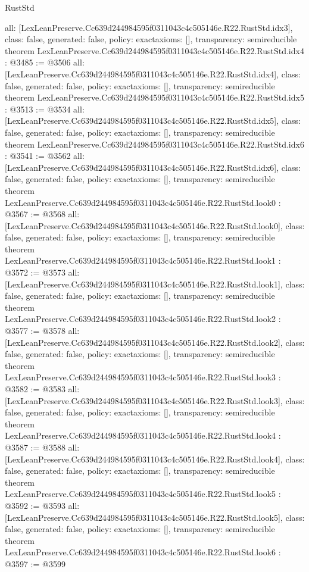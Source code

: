 \begin{lexlean}{RustStd}
\begin{coremodule}
{  all: [LexLeanPreserve.Cc639d244984595f0311043c4c505146e.R22.RustStd.idx3],
  class: false,
  generated: false,
  policy: exact{axioms: []},
  transparency: semireducible
}
theorem LexLeanPreserve.Cc639d244984595f0311043c4c505146e.R22.RustStd.idx4 : @3485 := @3506 {
  all: [LexLeanPreserve.Cc639d244984595f0311043c4c505146e.R22.RustStd.idx4],
  class: false,
  generated: false,
  policy: exact{axioms: []},
  transparency: semireducible
}
theorem LexLeanPreserve.Cc639d244984595f0311043c4c505146e.R22.RustStd.idx5 : @3513 := @3534 {
  all: [LexLeanPreserve.Cc639d244984595f0311043c4c505146e.R22.RustStd.idx5],
  class: false,
  generated: false,
  policy: exact{axioms: []},
  transparency: semireducible
}
theorem LexLeanPreserve.Cc639d244984595f0311043c4c505146e.R22.RustStd.idx6 : @3541 := @3562 {
  all: [LexLeanPreserve.Cc639d244984595f0311043c4c505146e.R22.RustStd.idx6],
  class: false,
  generated: false,
  policy: exact{axioms: []},
  transparency: semireducible
}
theorem LexLeanPreserve.Cc639d244984595f0311043c4c505146e.R22.RustStd.look0 : @3567 := @3568 {
  all: [LexLeanPreserve.Cc639d244984595f0311043c4c505146e.R22.RustStd.look0],
  class: false,
  generated: false,
  policy: exact{axioms: []},
  transparency: semireducible
}
theorem LexLeanPreserve.Cc639d244984595f0311043c4c505146e.R22.RustStd.look1 : @3572 := @3573 {
  all: [LexLeanPreserve.Cc639d244984595f0311043c4c505146e.R22.RustStd.look1],
  class: false,
  generated: false,
  policy: exact{axioms: []},
  transparency: semireducible
}
theorem LexLeanPreserve.Cc639d244984595f0311043c4c505146e.R22.RustStd.look2 : @3577 := @3578 {
  all: [LexLeanPreserve.Cc639d244984595f0311043c4c505146e.R22.RustStd.look2],
  class: false,
  generated: false,
  policy: exact{axioms: []},
  transparency: semireducible
}
theorem LexLeanPreserve.Cc639d244984595f0311043c4c505146e.R22.RustStd.look3 : @3582 := @3583 {
  all: [LexLeanPreserve.Cc639d244984595f0311043c4c505146e.R22.RustStd.look3],
  class: false,
  generated: false,
  policy: exact{axioms: []},
  transparency: semireducible
}
theorem LexLeanPreserve.Cc639d244984595f0311043c4c505146e.R22.RustStd.look4 : @3587 := @3588 {
  all: [LexLeanPreserve.Cc639d244984595f0311043c4c505146e.R22.RustStd.look4],
  class: false,
  generated: false,
  policy: exact{axioms: []},
  transparency: semireducible
}
theorem LexLeanPreserve.Cc639d244984595f0311043c4c505146e.R22.RustStd.look5 : @3592 := @3593 {
  all: [LexLeanPreserve.Cc639d244984595f0311043c4c505146e.R22.RustStd.look5],
  class: false,
  generated: false,
  policy: exact{axioms: []},
  transparency: semireducible
}
theorem LexLeanPreserve.Cc639d244984595f0311043c4c505146e.R22.RustStd.look6 : @3597 := @3599 {
}
\end{coremodule}
\end{lexlean}
